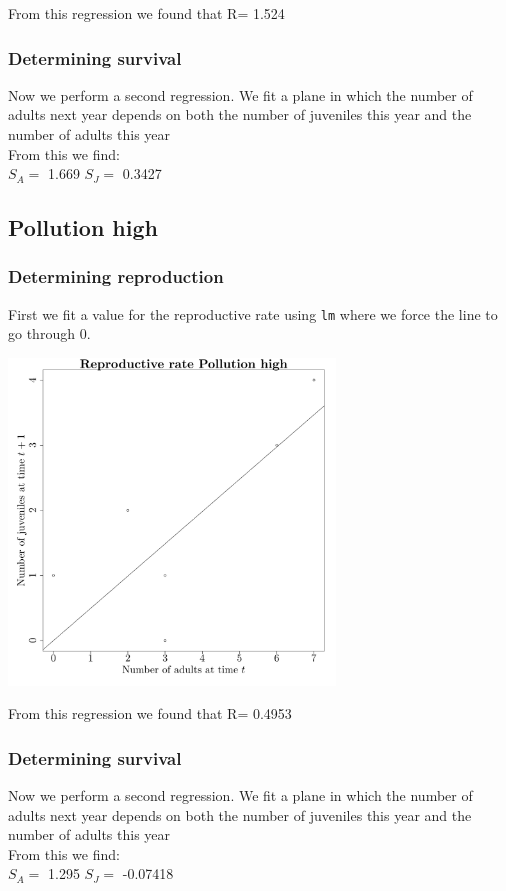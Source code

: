 \documentclass{article}\usepackage[]{graphicx}\usepackage[]{color}
\begin{document}
 From this regression we found that R= 1.524 

\subsubsection{Determining survival}

Now we perform a second regression. We fit a plane in which the number of adults next year depends on both the number of juveniles this year and the number of adults this year\\From this we find:\\ 
$S_A=$ 1.669 
$S_J=$ 0.3427 
\subsection{ Pollution high }
\subsubsection{Determining reproduction}

First we fit a value for the reproductive rate using \texttt{lm} where we force the line to go through $0$. 



{\centering \includegraphics[width=0.65\textwidth]{figure/k54} 

}



 From this regression we found that R= 0.4953 

\subsubsection{Determining survival}

Now we perform a second regression. We fit a plane in which the number of adults next year depends on both the number of juveniles this year and the number of adults this year\\From this we find:\\ 
$S_A=$ 1.295 
$S_J=$ -0.07418 
\end{document}
